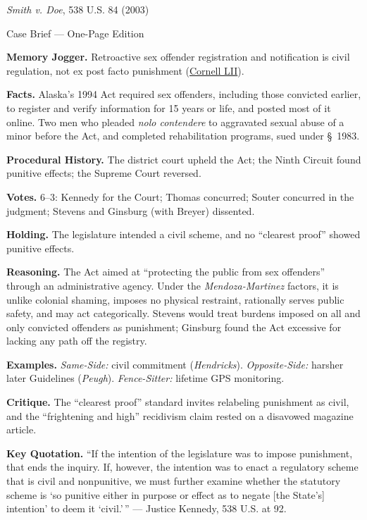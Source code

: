\documentclass[12pt]{article}
\begin{document}
\begin{center}
{\Large \textit{Smith v. Doe}, 538 U.S. 84 (2003)\par}
\vspace{0.3em}
{\normalsize Case Brief --- One-Page Edition\par}
\end{center}

\textbf{Memory Jogger.} Retroactive sex offender registration and notification is civil regulation, not ex post facto punishment (\href{https://www.law.cornell.edu/supct/html/01-729.ZO.html}{Cornell LII}).

\textbf{Facts.} Alaska's 1994 Act required sex offenders, including those convicted earlier, to register and verify information for 15 years or life, and posted most of it online. Two men who pleaded \textit{nolo contendere} to aggravated sexual abuse of a minor before the Act, and completed rehabilitation programs, sued under \S~1983.

\textbf{Procedural History.} The district court upheld the Act; the Ninth Circuit found punitive effects; the Supreme Court reversed.

\textbf{Votes.} 6--3: Kennedy for the Court; Thomas concurred; Souter concurred in the judgment; Stevens and Ginsburg (with Breyer) dissented.

\textbf{Holding.} The legislature intended a civil scheme, and no ``clearest proof'' showed punitive effects.

\textbf{Reasoning.} The Act aimed at ``protecting the public from sex offenders'' through an administrative agency. Under the \textit{Mendoza-Martinez} factors, it is unlike colonial shaming, imposes no physical restraint, rationally serves public safety, and may act categorically. Stevens would treat burdens imposed on all and only convicted offenders as punishment; Ginsburg found the Act excessive for lacking any path off the registry.

\textbf{Examples.} \emph{Same-Side:} civil commitment (\textit{Hendricks}). \emph{Opposite-Side:} harsher later Guidelines (\textit{Peugh}). \emph{Fence-Sitter:} lifetime GPS monitoring.

\textbf{Critique.} The ``clearest proof'' standard invites relabeling punishment as civil, and the ``frightening and high'' recidivism claim rested on a disavowed magazine article.

\textbf{Key Quotation.} ``If the intention of the legislature was to impose punishment, that ends the inquiry. If, however, the intention was to enact a regulatory scheme that is civil and nonpunitive, we must further examine whether the statutory scheme is `so punitive either in purpose or effect as to negate [the State's] intention' to deem it `civil.'\,'' --- Justice Kennedy, 538 U.S. at 92.
\end{document}
